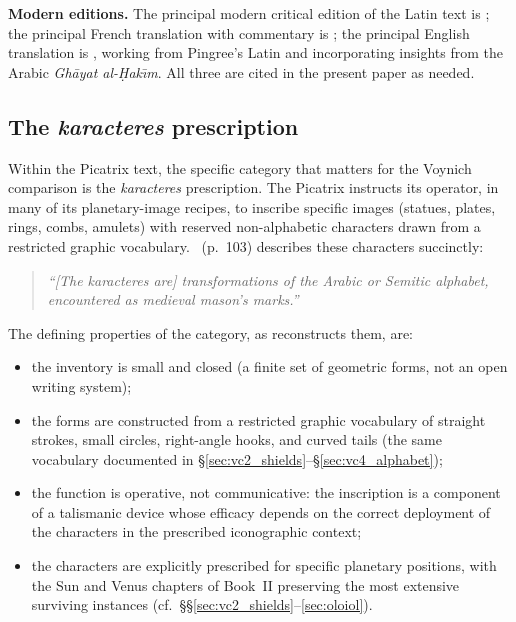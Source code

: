 \noindent\textbf{Modern editions.} The principal modern critical
edition of the Latin text is \citet{pingree1986}; the principal
French translation with commentary is \citet{bakhouche2003}; the
principal English translation is \citet{attrell2019}, working from
Pingree's Latin and incorporating insights from the Arabic
\textit{Gh\=ayat al-\d{H}ak\={\i}m}. All three are cited in the
present paper as needed.

\subsection{The \textit{karacteres} prescription}
\label{sec:karacteres_prescription}

Within the Picatrix text, the specific category that matters for the
Voynich comparison is the \textit{karacteres} prescription. The
Picatrix instructs its operator, in many of its planetary-image
recipes, to inscribe specific images (statues, plates, rings, combs,
amulets) with reserved non-alphabetic characters drawn from a
restricted graphic vocabulary. \citet{sniezynska2009}~(p.~103)
describes these characters succinctly:

\begin{quote}
\itshape
``[The karacteres are] transformations of the Arabic or Semitic
alphabet, encountered as medieval mason's marks.''
\end{quote}

\noindent The defining properties of the category, as
\citet{sniezynska2009} reconstructs them, are:

\begin{itemize}[itemsep=0pt,topsep=2pt]
\item the inventory is small and closed (a finite set of geometric
forms, not an open writing system);
\item the forms are constructed from a restricted graphic vocabulary
of straight strokes, small circles, right-angle hooks, and curved
tails (the same vocabulary documented in
\S\ref{sec:vc2_shields}--\S\ref{sec:vc4_alphabet});
\item the function is operative, not communicative: the inscription
is a component of a talismanic device whose efficacy depends on the
correct deployment of the characters in the prescribed iconographic
context;
\item the characters are explicitly prescribed for specific
planetary positions, with the Sun and Venus chapters of Book~II
preserving the most extensive surviving instances (cf.\
\S\S\ref{sec:vc2_shields}--\ref{sec:oloiol}).
\end{itemize}

